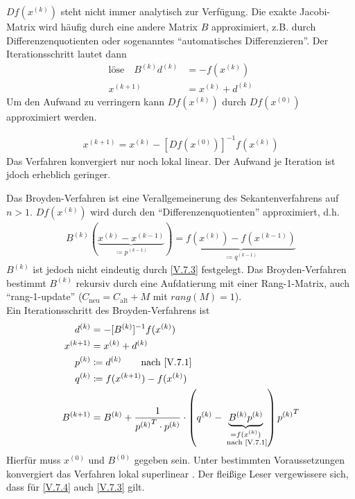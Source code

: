 $Df(x^{(k)})$ steht nicht immer analytisch zur Verfügung.
Die exakte Jacobi-Matrix wird häufig durch eine andere Matrix $B$ approximiert, 
z.B. durch Differenzenquotienten oder sogenanntes
\enquote{automatisches Differenzieren}.
Der Iterationsschritt lautet dann
\begin{align}
\text{löse}\quad B^{(k)}d^{(k)} &= -f(x^{(k)}) 
\label{V.7.1} \\\nonumber
x^{(k+1)} &=x^{(k)} + d^{(k)}
\end{align}
Um den Aufwand zu verringern kann $Df(x^{(k)})$ durch
$Df(x^{(0)})$ approximiert werden.


\begin{gather}
x^{(k+1)} = x^{(k)} -[Df(x^{(0)})]^{-1} f(x^{(k)})
\label{V.7.2}
\end{gather}
Das Verfahren konvergiert nur noch lokal linear.
Der Aufwand je Iteration ist jdoch erheblich geringer.



Das Broyden-Verfahren ist eine Verallgemeinerung des Sekantenverfahrens
auf $n>1$. $Df(x^{(k)})$ wird durch den
\enquote{Differenzenquotienten} approximiert, d.h.
\begin{gather}
B^{(k)}(\underbrace{x^{(k)}-x^{(k-1)}}_{\coloneqq p^{(k-1)}})
= \underbrace{f(x^{(k)})-f(x^{(k-1)})}_{\coloneqq
	q^{(k-1)}}
\label{V.7.3}
\end{gather}
$B^{(k)}$ ist jedoch nicht eindeutig durch \eqref{V.7.3} festgelegt.
Das Broyden-Verfahren bestimmt $B^{(k)}$ rekursiv durch eine 
Aufdatierung mit einer Rang-1-Matrix, auch \enquote{rang-1-update}
($C_\text{neu} = C_\text{alt} +M$ mit $rang(M)=1$). \\

Ein Iterationsschritt des Broyden-Verfahrens ist 
\begin{align}\nonumber
d^{(k)} &= -[B^{(k)}]^{-1} f(x^{(k)}) \\\nonumber
x^{(k+1)} &= x^{(k)} + d^{(k)} \\\nonumber
p^{(k)} & \coloneqq d^{(k)} \qquad \text{nach
	\eqref{V.7.1}}\\\nonumber
q^{(k)} & \coloneqq f(x^{(k+1)})-f(x^{(k)}) \\
B^{(k+1)} & = B^{(k)} + \frac{1}{{p^{(k)}}^T\cdot p^{(k)}}
\cdot \left(q^{(k)}-
\underbrace{B^{(k)}p^{(k)}}_{\substack{=f(x^{(k)})\\
		\text{ nach \eqref{V.7.1}}}}
\right){p^{(k)}}^T
\label{V.7.4}
\end{align}
Hierfür muss $x^{(0)} $ und $B^{(0)}$ gegeben sein.
Unter bestimmten Voraussetzungen konvergiert das Verfahren lokal
superlinear \cite[siehe][dortige Referenzen]{stoerbulirsch}.
Der fleißige Leser vergewissere sich, dass für
\eqref{V.7.4} auch \eqref{V.7.3} gilt.


